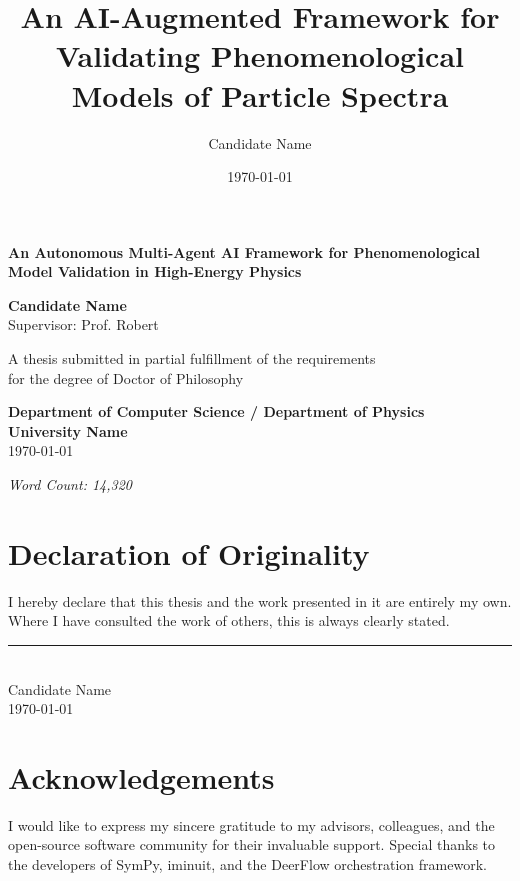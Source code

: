 \documentclass[12pt, a4paper]{report}
\title{An AI-Augmented Framework for Validating Phenomenological Models of Particle Spectra}
\author{Candidate Name}
\date{\today}
\begin{document}
\begin{titlepage}
    \begin{center}
        \vspace*{1cm}
        
        \Huge
        \textbf{An Autonomous Multi-Agent AI Framework for Phenomenological Model Validation in High-Energy Physics}
        
        \vspace{1.5cm}
        
        \Large
        \textbf{Candidate Name}\\
        Supervisor: Prof. Robert
        
        \vspace{2.5cm}
        
        \normalsize
        A thesis submitted in partial fulfillment of the requirements \\
        for the degree of Doctor of Philosophy
        
        \vspace{2.5cm}
        
        \textbf{Department of Computer Science / Department of Physics}\\
        \textbf{University Name}\\
        \today
        
        \vspace{1.5cm}
        \textit{Word Count: 14,320}
        
    \end{center}
\end{titlepage}

\chapter*{Declaration of Originality}
I hereby declare that this thesis and the work presented in it are entirely my own. Where I have consulted the work of others, this is always clearly stated.

\vspace{2cm}
\noindent\rule{5cm}{0.4pt}\\
Candidate Name \\
\today

\chapter*{Acknowledgements}
I would like to express my sincere gratitude to my advisors, colleagues, and the open-source software community for their invaluable support. Special thanks to the developers of SymPy, iminuit, and the DeerFlow orchestration framework.
\end{document}
